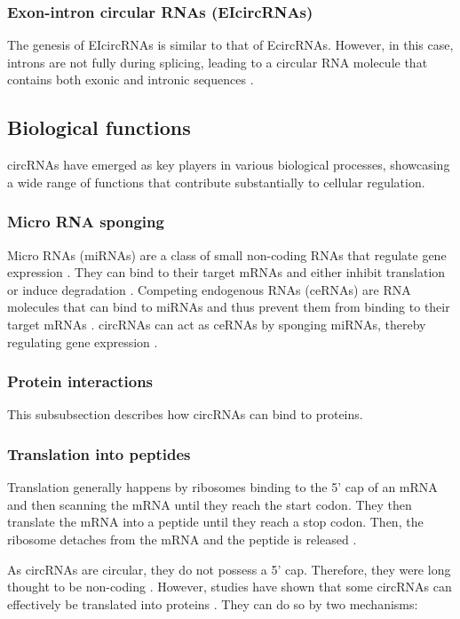 \subsubsection{Exon-intron circular RNAs (EIcircRNAs)}
The genesis of EIcircRNAs is similar to that of EcircRNAs. However, in this
case, introns are not fully during splicing, leading to a circular RNA molecule
that contains both exonic and intronic sequences \supercite{xiao_circular_2022}.

\subsection{Biological functions}
circRNAs have emerged as key players in various biological processes, showcasing
a wide range of functions that contribute substantially to cellular regulation.

\subsubsection{Micro RNA sponging}
Micro RNAs (miRNAs) are a class of small non-coding RNAs that regulate gene
expression \supercite{bartel_micrornas_2009}. They can bind to their target
mRNAs and either inhibit translation or induce degradation
\supercite{bartel_micrornas_2009}. Competing endogenous RNAs (ceRNAs) are RNA
molecules that can bind to miRNAs and thus prevent them from binding to their
target mRNAs \supercite{tay_multilayered_2014}. circRNAs can act as ceRNAs by
sponging miRNAs, thereby regulating gene expression
\supercite{xiao_circular_2022}.

\subsubsection{Protein interactions}
This subsubsection describes how circRNAs can bind to proteins.

\subsubsection{Translation into peptides}
Translation generally happens by ribosomes binding to the 5' cap of an mRNA and
then scanning the mRNA until they reach the start codon. They then translate the
mRNA into a peptide until they reach a stop codon. Then, the ribosome detaches
from the mRNA and the peptide is released \supercite{hinnebusch_mechanism_2012}.

As circRNAs are circular, they do not possess a 5' cap. Therefore, they were
long thought to be non-coding \supercite{bao_regulatory_2019,greene_circular_2017}. However, studies have shown that
some circRNAs can effectively be translated into proteins \supercite{chen_expanding_2020}.
They can do so by two mechanisms:

